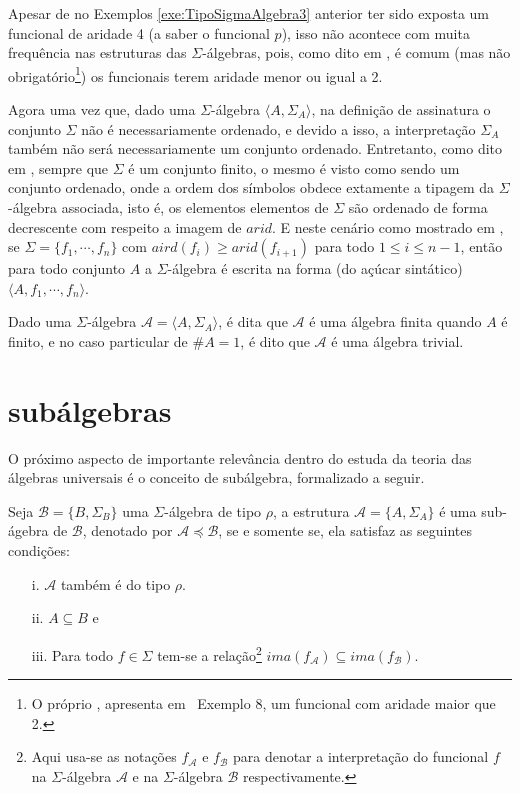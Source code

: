 Apesar de no Exemplos \ref{exe:TipoSigmaAlgebra3} anterior ter sido exposta um funcional de aridade 4 (a saber o funcional $p$), isso não acontece com muita frequência nas estruturas das $\Sigma$-álgebras, pois, como dito em \cite{stanley1981}, é comum (mas não obrigatório\footnote{O próprio \cite{stanley1981}, apresenta em \textsection \ Exemplo 8, um funcional com aridade maior que 2.}) os funcionais terem aridade menor ou igual a 2.

Agora uma vez que, dado uma $\Sigma$-álgebra $\langle A, \Sigma_A \rangle$, na definição de assinatura o conjunto $\Sigma$ não é necessariamente ordenado, e devido a isso, a interpretação $\Sigma_A$ também não será necessariamente um conjunto ordenado. Entretanto, como dito em \cite{carmo2013}, sempre que $\Sigma$ é um conjunto finito, o mesmo é visto como sendo um conjunto ordenado, onde a ordem dos símbolos obdece extamente a tipagem da $\Sigma$-álgebra associada, isto é, os elementos elementos de $\Sigma$ são ordenado de forma decrescente com respeito a imagem de $arid$. E neste cenário como mostrado em \cite{carmo2013, klaus2001, stanley1981}, se $\Sigma = \{f_1, \cdots, f_n\}$ com $aird(f_i) \geq arid(f_{i+1})$ para todo $1 \leq i \leq n-1$, então para todo conjunto $A$ a $\Sigma$-álgebra é escrita na forma (do açúcar sintático) $\langle A, f_1, \cdots, f_n \rangle$. 

\begin{nota}
  Dado uma $\Sigma$-álgebra $\mathcal{A} = \langle A, \Sigma_A \rangle$, é dita que $\mathcal{A}$ é uma álgebra finita quando $A$ é finito, e no caso particular de $\#A = 1$, é dito que $\mathcal{A}$ é uma álgebra trivial.
\end{nota}

\section{subálgebras}\label{sec:SubAlgebras}

O próximo aspecto de importante relevância dentro do estuda da teoria das álgebras universais é o conceito de subálgebra, formalizado a seguir. 

\begin{definicao}[subálgebra]\label{def:SubAlgebras}
  Seja $\mathcal{B} = \{B, \Sigma_B\}$ uma $\Sigma$-álgebra de tipo $\rho$, a estrutura $\mathcal{A} = \{A, \Sigma_A\}$ é uma sub-ágebra de $\mathcal{B}$, denotado por $\mathcal{A} \preccurlyeq  \mathcal{B}$, se e somente se, ela satisfaz as seguintes condições:
  \begin{itemize}
    \item[i.] $\mathcal{A}$ também é do tipo $\rho$.
    \item[ii.] $A \subseteq B$ e
    \item[iii.] Para todo $f \in \Sigma$ tem-se a relação\footnote{Aqui usa-se as notações $f_\mathcal{A}$ e $f_\mathcal{B}$ para denotar a interpretação do funcional $f$ na $\Sigma$-álgebra $\mathcal{A}$ e na $\Sigma$-álgebra $\mathcal{B}$ respectivamente.} $ima(f_\mathcal{A}) \subseteq ima(f_\mathcal{B})$.
  \end{itemize}
\end{definicao}

